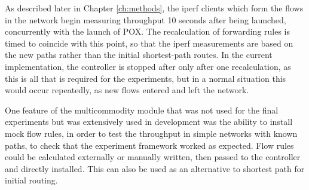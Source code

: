 As described later in Chapter \ref{ch:methods}, the iperf clients which form the flows in the network begin measuring throughput 10 seconds after being launched, concurrently with the launch of POX. The recalculation of forwarding rules is timed to coincide with this point, so that the iperf measurements are based on the new paths rather than the initial shortest-path routes.  In the current implementation, the controller is stopped after only after one recalculation, as this is all that is required for the experiments, but in a normal situation this would occur repeatedly, as new flows entered and left the network.

One feature of the multicommodity module that was not used for the final experiments but was extensively used in development was the ability to install mock flow rules, in order to test the throughput in simple networks with known paths, to check that the experiment framework worked as expected. Flow rules could be calculated externally or manually written, then passed to the controller and directly installed. This can also be used as an alternative to shortest path for initial routing.
